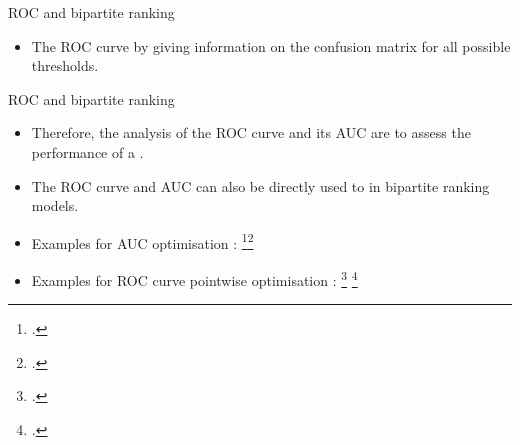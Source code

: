 \begin{frame}{ROC and bipartite ranking}

\begin{itemize}
    \item  The ROC curve  by giving information on the confusion matrix for all possible thresholds.
\end{itemize}

\begin{figure}
    \centering
   
    
\end{figure}




\end{frame}




\begin{frame}{ROC and bipartite ranking}

    \begin{itemize}
        \item  Therefore, the analysis of the ROC curve and its AUC are  to assess the performance of a .
        \item The ROC curve and AUC can also be directly used to  in bipartite ranking models.
        \item Examples for AUC optimisation : \footcite{clemencon2008ranking}\footcite{zhao2011online}
        \item Examples for ROC curve pointwise optimisation : \footcite{pmlr-v80-vogel18a} \footcite{lieberman2024optimizing}
    
    \end{itemize}
\end{frame}
        

